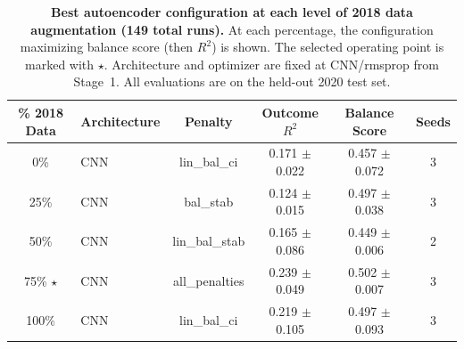 \begin{table}[ht]
\centering
\caption{\textbf{Best autoencoder configuration at each level of 2018 data augmentation (149 total runs).}
At each percentage, the configuration maximizing balance score (then $R^2$) is shown.
The selected operating point is marked with $\star$.
Architecture and optimizer are fixed at CNN/rmsprop from Stage~1.
All evaluations are on the held-out 2020 test set.}
\label{tab:incremental_data}
\begin{tabular}{clcccc}
\toprule
\% 2018 Data & Architecture & Penalty & Outcome $R^2$ & Balance Score & Seeds \\
\midrule
0\% & CNN & lin\_bal\_ci & 0.171 $\pm$ 0.022 & 0.457 $\pm$ 0.072 & 3 \\
25\% & CNN & bal\_stab & 0.124 $\pm$ 0.015 & 0.497 $\pm$ 0.038 & 3 \\
50\% & CNN & lin\_bal\_stab & 0.165 $\pm$ 0.086 & 0.449 $\pm$ 0.006 & 2 \\
75\% $\star$ & CNN & all\_penalties & 0.239 $\pm$ 0.049 & 0.502 $\pm$ 0.007 & 3 \\
100\% & CNN & lin\_bal\_ci & 0.219 $\pm$ 0.105 & 0.497 $\pm$ 0.093 & 3 \\
\bottomrule
\end{tabular}
\end{table}
